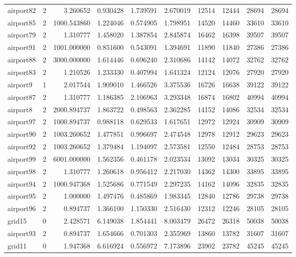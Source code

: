 \begin{longtable}{|l|r|r|r|r|r|r|r|r|r|}
airport82 & 2 & 3.260652 & 0.930428 & 1.739591 & 2.670019 & 12514 & 12444 & 28694 & 28694 \\
airport85 & 2 & 1000.543860 & 1.224046 & 0.574905 & 1.798951 & 14520 & 14460 & 33610 & 33610 \\
airport79 & 2 & 1.310777 & 1.458020 & 1.387854 & 2.845874 & 16462 & 16398 & 39507 & 39507 \\
airport91 & 2 & 1001.000000 & 0.851600 & 0.543091 & 1.394691 & 11890 & 11840 & 27386 & 27386 \\
airport88 & 2 & 3000.000000 & 1.614446 & 0.696240 & 2.310686 & 14142 & 14072 & 32762 & 32762 \\
airport83 & 2 & 1.210526 & 1.233330 & 0.407994 & 1.641324 & 12124 & 12076 & 27920 & 27920 \\
airport9 & 1 & 2.017544 & 1.909010 & 1.466526 & 3.375536 & 16726 & 16638 & 39122 & 39122 \\
airport87 & 2 & 1.310777 & 1.186385 & 2.106963 & 3.293348 & 16874 & 16802 & 40994 & 40994 \\
airport8 & 2 & 2000.894737 & 1.863722 & 0.498563 & 2.362285 & 14152 & 14086 & 32534 & 32534 \\
airport97 & 2 & 1000.894737 & 0.988118 & 0.629533 & 1.617651 & 12972 & 12924 & 30909 & 30909 \\
airport90 & 2 & 1003.260652 & 1.477851 & 0.996697 & 2.474548 & 12978 & 12912 & 29623 & 29623 \\
airport92 & 2 & 1003.260652 & 1.379484 & 1.194097 & 2.573581 & 12550 & 12484 & 28753 & 28753 \\
airport99 & 2 & 6001.000000 & 1.562356 & 0.461178 & 2.023534 & 13092 & 13034 & 30325 & 30325 \\
airport98 & 2 & 1.310777 & 1.260618 & 0.956412 & 2.217030 & 14362 & 14300 & 33895 & 33895 \\
airport94 & 2 & 1000.947368 & 1.525686 & 0.771549 & 2.297235 & 14162 & 14096 & 32835 & 32835 \\
airport95 & 2 & 1.000000 & 1.497476 & 0.485869 & 1.983345 & 12840 & 12786 & 29738 & 29738 \\
airport96 & 2 & 0.894737 & 1.366100 & 1.150330 & 2.516430 & 12312 & 12246 & 28105 & 28105 \\
grid15 & 0 & 2.428571 & 6.149038 & 1.854441 & 8.003479 & 26472 & 26318 & 50038 & 50038 \\
airport93 & 2 & 0.894737 & 1.654666 & 0.701303 & 2.355969 & 13860 & 13782 & 31607 & 31607 \\
grid11 & 0 & 1.947368 & 6.616924 & 0.556972 & 7.173896 & 23902 & 23782 & 45245 & 45245 \\

\end{longtable}
